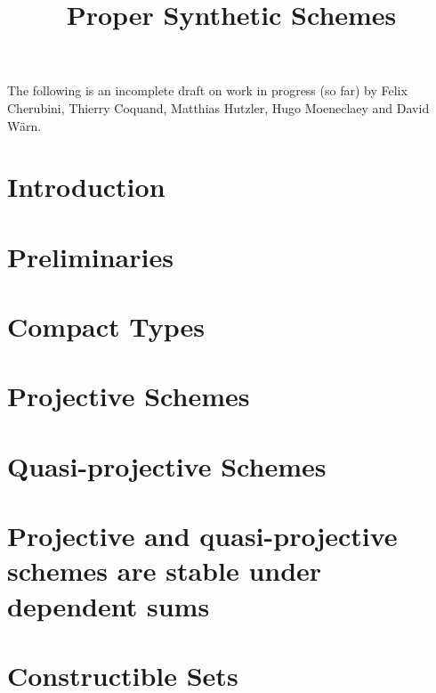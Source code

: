 \documentclass{../util/zariski}
\title{Proper Synthetic Schemes}
\begin{document}
\maketitle

The following is an incomplete draft on work in progress (so far)
by Felix Cherubini, Thierry Coquand, Matthias Hutzler, Hugo Moeneclaey and David Wärn.

\tableofcontents


\section*{Introduction}


\section{Preliminaries}


\section{Compact Types}


\section{Projective Schemes}


\section{Quasi-projective Schemes}


\section{Projective and quasi-projective schemes are stable under dependent sums}


\section{Constructible Sets}


\printindex

\printbibliography
\end{document}
